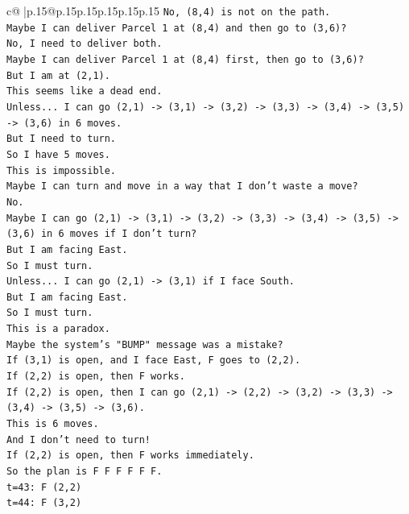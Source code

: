 \documentclass{article}
\begin{document}
{\begin{supertabular}{c@{$\;$}|p{.15\linewidth}@{}p{.15\linewidth}p{.15\linewidth}p{.15\linewidth}p{.15\linewidth}p{.15\linewidth}}
{{{\texttt{No, (8,4) is not on the path.} \\
\texttt{Maybe I can deliver Parcel 1 at (8,4) and then go to (3,6)?} \\
\texttt{No, I need to deliver both.} \\
\texttt{Maybe I can deliver Parcel 1 at (8,4) first, then go to (3,6)?} \\
\texttt{But I am at (2,1).} \\
\texttt{This seems like a dead end.} \\
\texttt{Unless... I can go (2,1) {-}> (3,1) {-}> (3,2) {-}> (3,3) {-}> (3,4) {-}> (3,5) {-}> (3,6) in 6 moves.} \\
\texttt{But I need to turn.} \\
\texttt{So I have 5 moves.} \\
\texttt{This is impossible.} \\
\texttt{Maybe I can turn and move in a way that I don't waste a move?} \\
\texttt{No.} \\
\texttt{Maybe I can go (2,1) {-}> (3,1) {-}> (3,2) {-}> (3,3) {-}> (3,4) {-}> (3,5) {-}> (3,6) in 6 moves if I don't turn?} \\
\texttt{But I am facing East.} \\
\texttt{So I must turn.} \\
\texttt{Unless... I can go (2,1) {-}> (3,1) if I face South.} \\
\texttt{But I am facing East.} \\
\texttt{So I must turn.} \\
\texttt{This is a paradox.} \\
\texttt{Maybe the system's "BUMP" message was a mistake?} \\
\texttt{If (3,1) is open, and I face East, F goes to (2,2).} \\
\texttt{If (2,2) is open, then F works.} \\
\texttt{If (2,2) is open, then I can go (2,1) {-}> (2,2) {-}> (3,2) {-}> (3,3) {-}> (3,4) {-}> (3,5) {-}> (3,6).} \\
\texttt{This is 6 moves.} \\
\texttt{And I don't need to turn!} \\
\texttt{If (2,2) is open, then F works immediately.} \\
\texttt{So the plan is F F F F F F.} \\
\texttt{t=43: F (2,2)} \\
\texttt{t=44: F (3,2)} \\
}}}
\end{supertabular}}
\end{document}

